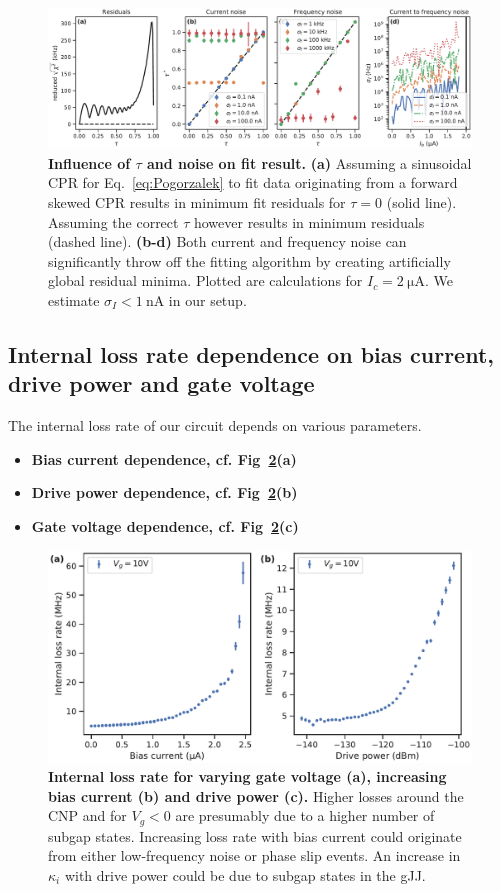 \begin{figure}
	\centering
	\includegraphics[width=\linewidth]{chapter-gJJ-CPR/figs/SMFigure-noise}
	\caption{
		\textbf{Influence of $\tau$ and noise on fit result.}
		\textbf{(a)} Assuming a sinusoidal CPR for Eq.~\ref{eq:Pogorzalek} to fit data originating from a forward skewed CPR results in minimum fit residuals for $\tau=0$ (solid line).
		Assuming the correct $\tau$ however results in minimum residuals (dashed line).
		\textbf{(b-d)} Both current and frequency noise can significantly throw off the fitting algorithm by creating artificially global residual minima.
		Plotted are calculations for $I_c=\SI{2}{\micro\ampere}$.
		We estimate $\sigma_I<\SI{1}{\nano\ampere}$ in our setup.
	}
	\label{fig:SMres}
\end{figure}

\subsection{Internal loss rate dependence on bias current, drive power and gate voltage}\label{sec:kintib}

The internal loss rate of our circuit depends on various parameters.

\begin{itemize}
	\item \textbf{Bias current dependence, cf. Fig~\ref{fig:SMFig-lossrates}(a)}
	\item \textbf{Drive power dependence, cf. Fig~\ref{fig:SMFig-lossrates}(b)}
	\item \textbf{Gate voltage dependence, cf. Fig~\ref{fig:SMFig-lossrates}(c)}
\end{itemize}

\begin{figure}
	\centering
	\includegraphics[width=0.583\linewidth]{chapter-gJJ-CPR/figs/SMFigure-lossrates}
	\caption{
		\textbf{Internal loss rate for varying gate voltage (a), increasing bias current (b) and drive power (c).}
		Higher losses around the CNP and for $V_g<0$ are presumably due to a higher number of subgap states.
		Increasing loss rate with bias current could originate from either low-frequency noise or phase slip events.
		An increase in $\kappa_i$ with drive power could be due to subgap states in the gJJ.
	}
	\label{fig:SMFig-lossrates}
\end{figure}


